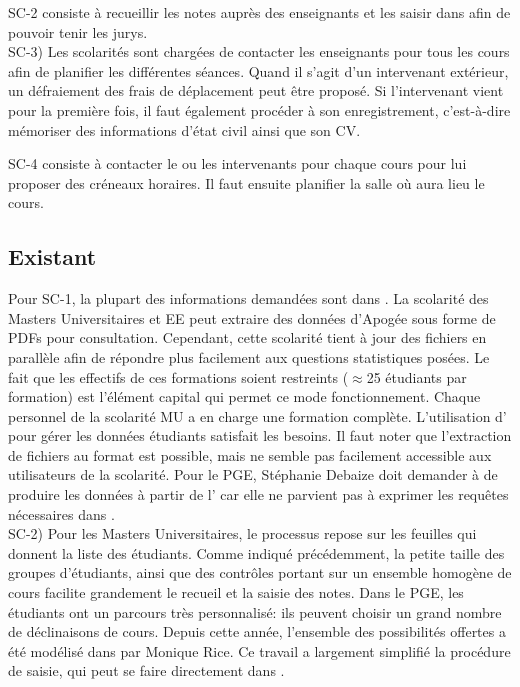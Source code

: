 \documentclass{book}
\begin{document}
SC-2 consiste à recueillir les notes auprès des enseignants et les saisir
dans  afin de pouvoir tenir les jurys.\\


SC-3) Les scolarités sont chargées de contacter les enseignants pour tous
les cours afin de planifier les différentes séances. Quand il s'agit d'un 
intervenant extérieur, un défraiement des frais de déplacement peut être
proposé. Si l'intervenant vient pour la première fois, il faut également 
procéder à son enregistrement, c'est-à-dire mémoriser des informations 
d'état civil ainsi que son CV.

SC-4 consiste à contacter le ou les intervenants pour chaque cours pour
lui proposer des créneaux horaires. Il faut ensuite planifier la salle
où aura lieu le cours.


\subsection{Existant}

Pour SC-1, la plupart des informations demandées sont dans .
La scolarité des Masters Universitaires et EE peut extraire des données
d'Apogée sous forme de PDFs pour consultation. Cependant, cette scolarité
tient à jour des fichiers  en parallèle afin de répondre
plus facilement aux questions statistiques posées. Le fait que les effectifs
de ces formations soient restreints ($\approx$25 étudiants par formation) est 
l'élément capital qui permet ce mode fonctionnement. Chaque personnel
de la scolarité MU a en charge une formation complète. L'utilisation
d' pour gérer les données étudiants satisfait les besoins.
Il faut noter que l'extraction de fichiers au format  est 
possible, mais ne semble pas facilement accessible aux utilisateurs de 
la scolarité.
%
Pour le PGE, Stéphanie Debaize doit demander à \CK de produire les
données à partir de l' car elle ne parvient pas à
exprimer les requêtes nécessaires dans .\\

SC-2) Pour les Masters Universitaires, le processus repose sur les
feuilles  qui donnent la liste des étudiants. Comme
indiqué précédemment, la petite taille des groupes d'étudiants,
ainsi que des contrôles portant sur un ensemble homogène de cours
facilite grandement le recueil et la saisie des notes.
Dans le PGE, les étudiants ont un parcours très personnalisé: ils
peuvent choisir un grand nombre de déclinaisons de cours. Depuis 
cette année, l'ensemble des possibilités offertes a été modélisé
dans  par Monique Rice. Ce travail a largement
simplifié la procédure de saisie, qui peut se faire directement
dans .\\
\end{document}

